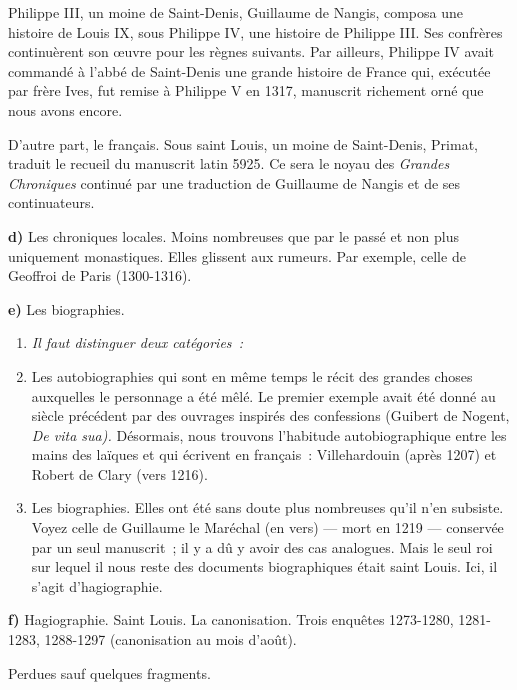 \documentclass[french,twoside]{book} %
\newlength{\listmod}
\newcommand{\listhead}[1]{\hspace{-1\listmod}\emph{#1}}
\newcommand{\labelchar}[1]{\textbf{\color{rubric} #1}}
\begin{document}
\label{p4} Philippe III, un moine de Saint-Denis, Guillaume de Nangis, composa une histoire de Louis IX, sous Philippe IV, une histoire de Philippe III. Ses confrères continuèrent son œuvre pour les règnes suivants. Par ailleurs, Philippe IV avait commandé à l’abbé de Saint-Denis une grande histoire de France qui, exécutée par frère Ives, fut remise à Philippe V en 1317, manuscrit richement orné que nous avons encore.\par
D’autre part, le français. Sous saint Louis, un moine de Saint-Denis, Primat, traduit le recueil du manuscrit latin 5925. Ce sera le noyau des \emph{Grandes Chroniques} continué par une traduction de Guillaume de Nangis et de ses continuateurs.\par
\bigbreak
\noindent \labelchar{d)} Les chroniques locales. Moins nombreuses que par le passé et non plus uniquement monastiques. Elles glissent aux rumeurs. Par exemple, celle de Geoffroi de Paris (1300-1316).\par
\bigbreak
\noindent \labelchar{e)} Les biographies.\par

\begin{enumerate}[itemsep=0pt,]
\item[]\listhead{Il faut distinguer deux catégories :}
\item Les autobiographies qui sont en même temps le récit des grandes choses auxquelles le personnage a été mêlé. Le premier exemple avait été donné au siècle précédent par des ouvrages inspirés des confessions (Guibert de Nogent, {\itshape De vita sua).} Désormais, nous trouvons l’habitude autobiographique entre les mains des laïques et qui écrivent en français : Villehardouin (après 1207) et Robert de Clary (vers 1216).
\item Les biographies. Elles ont été sans doute plus nombreuses qu’il n’en subsiste. Voyez celle de Guillaume le Maréchal (en vers) — mort en 1219 — conservée par un seul manuscrit ; il y a dû y avoir des cas analogues. Mais le seul roi sur lequel il nous reste des documents biographiques était saint Louis. Ici, il s’agit d’hagiographie.
\end{enumerate}

\bigbreak
\noindent \labelchar{f)} Hagiographie. Saint Louis. La canonisation. Trois enquêtes 1273-1280, 1281-1283, 1288-1297 (canonisation au mois d’août).\par
Perdues sauf quelques fragments.\par
\end{document}
